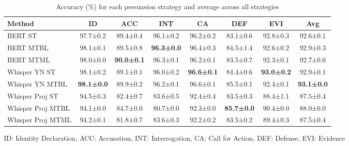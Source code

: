 \documentclass{article}
\begin{document}
\begin{table}[ht]
\centering
\small
\caption{Accuracy (\%) for each persuasion strategy and average across all strategies}
\label{tab:accuracy}
\setlength{\tabcolsep}{4pt}
\begin{tabular}{@{}lccccccc@{}}
\toprule
Method & ID & ACC & INT & CA & DEF & EVI & Avg \\
\midrule
BERT ST & 97.7±0.2 & 89.4±0.4 & 96.1±0.2 & 96.2±0.2 & 83.1±0.6 & 92.8±0.3 & 92.6±0.1 \\
BERT MTBL & 98.1±0.1 & 89.5±0.8 & \textbf{96.3±0.0} & 96.4±0.3 & 84.5±1.4 & 92.6±0.2 & 92.9±0.3 \\
BERT MTML & 98.0±0.0 & \textbf{90.0±0.1} & 96.3±0.1 & 96.2±0.1 & 83.5±0.7 & 92.3±0.1 & 92.7±0.6 \\
Whisper YN ST & 98.1±0.2 & 89.1±0.1 & 96.0±0.2 & \textbf{96.6±0.1} & 84.4±0.6 & \textbf{93.0±0.2} & 92.9±0.1 \\
Whisper YN MTBL & \textbf{98.1±0.0} & 89.9±0.2 & 96.2±0.1 & 96.6±0.1 & 85.5±0.1 & 92.4±0.1 & \textbf{93.1±0.0} \\
Whisper Proj ST & 94.5±0.3 & 82.4±0.7 & 83.6±0.5 & 92.4±0.4 & 83.5±0.3 & 88.4±1.1 & 87.5±0.4 \\
Whisper Proj MTBL & 94.1±0.0 & 84.7±0.0 & 80.7±0.0 & 92.3±0.0 & \textbf{85.7±0.0} & 90.4±0.0 & 88.0±0.0 \\
Whisper Proj MTML & 94.2±0.1 & 81.8±0.7 & 83.6±0.3 & 92.2±0.2 & 83.5±0.2 & 89.4±0.3 & 87.5±0.4 \\
\bottomrule
\end{tabular}
\parbox{\textwidth}{\small ID: Identity Declaration, ACC: Accusation, INT: Interrogation, CA: Call for Action, DEF: Defense, EVI: Evidence}
\end{table}
\end{document}
